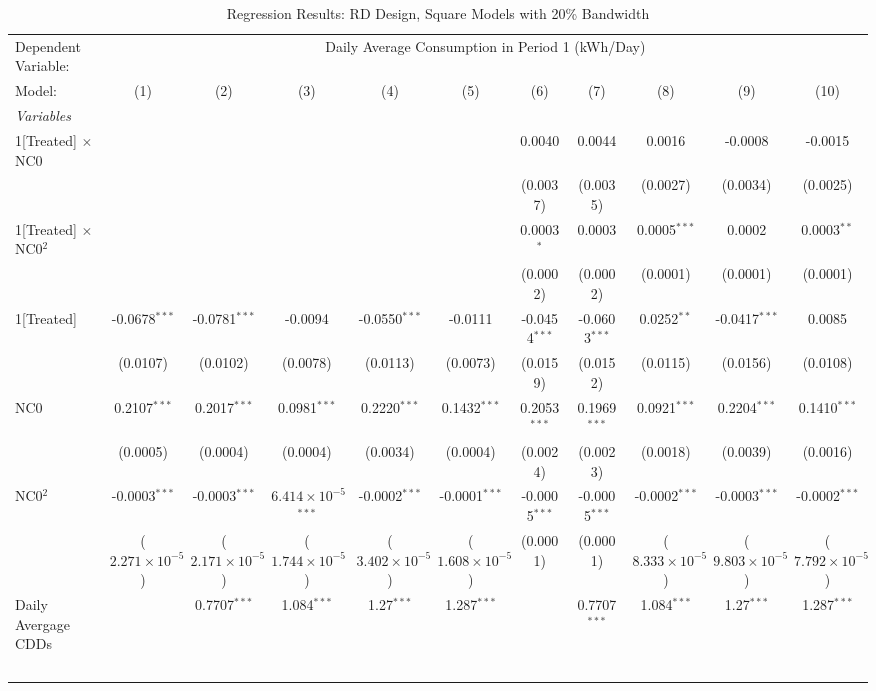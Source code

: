 \begin{table}[htbp]
\centering
\caption{\label{Table:Regression-Results_RD_Square_BW-20} Regression Results: RD Design, Square Models with 20\% Bandwidth}
\begin{tabular}{lcccccccccc}
\tabularnewline\toprule\toprule
Dependent Variable:&\multicolumn{10}{c}{Daily Average Consumption in Period 1 (kWh/Day)}\\
Model:&(1) & (2) & (3) & (4) & (5) & (6) & (7) & (8) & (9) & (10)\\
\midrule
\emph{Variables}&   &   &   &   &   &   &   &   &   &  \\
1[Treated] $\times $ NC0&   &    &    &    &    & 0.0040 & 0.0044 & 0.0016 & -0.0008 & -0.0015\\
  &   &    &    &    &    & (0.0037) & (0.0035) & (0.0027) & (0.0034) & (0.0025)\\
1[Treated] $\times $ NC0$^2$&   &    &    &    &    & 0.0003$^{*}$ & 0.0003 & 0.0005$^{***}$ & 0.0002 & 0.0003$^{**}$\\
  &   &    &    &    &    & (0.0002) & (0.0002) & (0.0001) & (0.0001) & (0.0001)\\
1[Treated]&-0.0678$^{***}$ & -0.0781$^{***}$ & -0.0094 & -0.0550$^{***}$ & -0.0111 & -0.0454$^{***}$ & -0.0603$^{***}$ & 0.0252$^{**}$ & -0.0417$^{***}$ & 0.0085\\
  &(0.0107) & (0.0102) & (0.0078) & (0.0113) & (0.0073) & (0.0159) & (0.0152) & (0.0115) & (0.0156) & (0.0108)\\
NC0&0.2107$^{***}$ & 0.2017$^{***}$ & 0.0981$^{***}$ & 0.2220$^{***}$ & 0.1432$^{***}$ & 0.2053$^{***}$ & 0.1969$^{***}$ & 0.0921$^{***}$ & 0.2204$^{***}$ & 0.1410$^{***}$\\
  &(0.0005) & (0.0004) & (0.0004) & (0.0034) & (0.0004) & (0.0024) & (0.0023) & (0.0018) & (0.0039) & (0.0016)\\
NC0$^2$&-0.0003$^{***}$ & -0.0003$^{***}$ & $6.414\times 10^{-5}$$^{***}$ & -0.0002$^{***}$ & -0.0001$^{***}$ & -0.0005$^{***}$ & -0.0005$^{***}$ & -0.0002$^{***}$ & -0.0003$^{***}$ & -0.0002$^{***}$\\
  &($2.271\times 10^{-5}$) & ($2.171\times 10^{-5}$) & ($1.744\times 10^{-5}$) & ($3.402\times 10^{-5}$) & ($1.608\times 10^{-5}$) & (0.0001) & (0.0001) & ($8.333\times 10^{-5}$) & ($9.803\times 10^{-5}$) & ($7.792\times 10^{-5}$)\\
Daily Avergage CDDs&   & 0.7707$^{***}$ & 1.084$^{***}$ & 1.27$^{***}$ & 1.287$^{***}$ &    & 0.7707$^{***}$ & 1.084$^{***}$ & 1.27$^{***}$ & 1.287$^{***}$\\
$$
\end{tabular}
\end{table}
